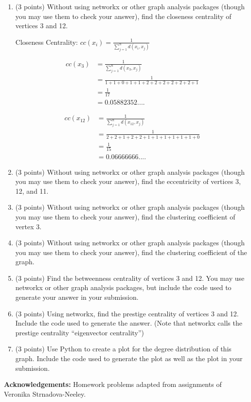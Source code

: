 \documentclass[11pt]{article}
\begin{document}
\begin{enumerate}

    \item (3 points) Without using networkx or other graph analysis packages
    (though you may use them to check your answer), find the closeness
    centrality of vertices 3 and 12.

    Closeness Centrality: $cc(x_{i}) = \frac{1}{\sum_{j=1}^{n} d( x_i , x_j )}$

    \begin{align*}
        cc(x_{3}) &= \frac{1}{\sum_{j=1}^{n} d( x_3 , x_j )} \\
        &= \frac{1}{1 + 1 + 0 + 1 + 1 + 2 + 2 + 2 + 2 + 2 + 2 + 1} \\
        &= \frac{1}{17} \\
        &= 0.05882352....
    \end{align*}

    \begin{align*}
        cc(x_{12}) &= \frac{1}{\sum_{j=1}^{n} d( x_{12} , x_j )} \\
        &= \frac{1}{2+2+1+2+2+1+1+1+1+1+1+0} \\
        &= \frac{1}{15} \\
        &= 0.06666666....
    \end{align*}

    \item (3 points) Without using networkx or other graph analysis packages
    (though you may use them to check your answer), find the eccentricity of
    vertices 3, 12, and 11.

    \item (3 points) Without using networkx or other graph analysis packages
    (though you may use them to check your answer), find the clustering
    coefficient of vertex 3.

    \item (3 points) Without using networkx or other graph analysis packages
    (though you may use them to check your answer), find the clustering
    coefficient of the graph.

    \item (3 points) Find the betweenness centrality of vertices 3 and 12. You
    may use networkx or other graph analysis packages, but include the code used
    to generate your answer in your submission.

    \item (3 points) Using networkx, find the prestige centrality of vertices 3
    and 12. Include the code used to generate the answer. (Note that networkx
    calls the prestige centrality ``eigenvector centrality'')

    \item (3 points) Use Python to create a plot for the degree distribution of
    this graph.  Include the code used to generate the plot as well as the plot
    in your submission.

\end{enumerate}

{\bf Acknowledgements:} Homework problems adapted from assignments of
Veronika Strnadova-Neeley.
\end{document}
